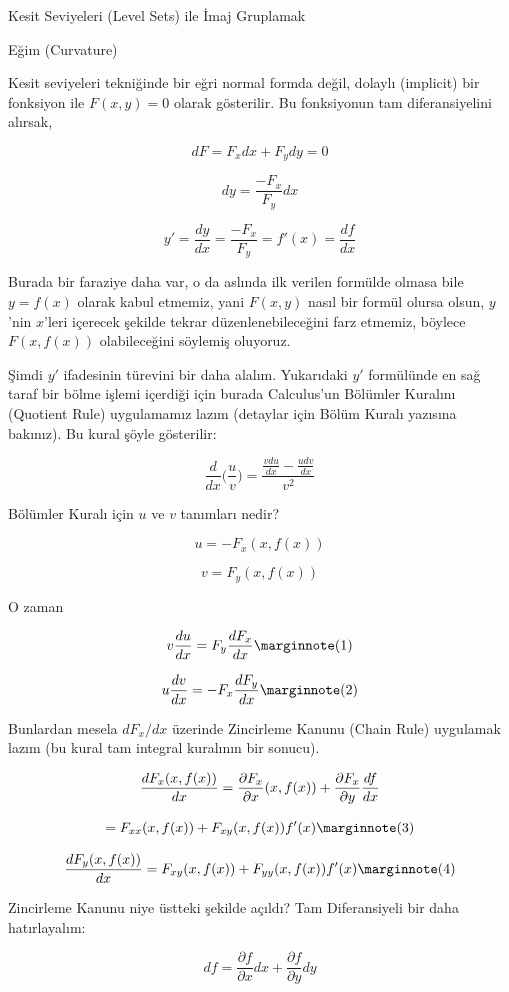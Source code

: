 \documentclass[12pt,fleqn]{article}\usepackage{../../common}
\begin{document}
Kesit Seviyeleri (Level Sets) ile İmaj Gruplamak 

Eğim (Curvature)

Kesit seviyeleri tekniğinde bir eğri normal formda değil, dolaylı
(implicit) bir fonksiyon ile $F(x,y) = 0$ olarak gösterilir. Bu fonksiyonun
tam diferansiyelini alırsak,

$$ dF = F_x dx + F_y dy = 0  $$

$$ dy = \frac{-F_x}{F_y}dx  $$

$$ y' = \frac{dy}{dx} = \frac{-F_x}{F_y} = f'(x) = \frac{df}{dx} $$

Burada bir faraziye daha var, o da aslında ilk verilen formülde olmasa bile
$y=f(x)$ olarak kabul etmemiz, yani $F(x,y)$ nasıl bir formül olursa olsun,
$y$'nin $x$'leri içerecek şekilde tekrar düzenlenebileceğini farz etmemiz,
böylece $F(x,f(x))$ olabileceğini söylemiş oluyoruz.

Şimdi $y'$ ifadesinin türevini bir daha alalım. Yukarıdaki $y'$ formülünde
en sağ taraf bir bölme işlemi içerdiği için burada Calculus'un Bölümler
Kuralını (Quotient Rule) uygulamamız lazım (detaylar için Bölüm Kuralı
yazısına bakınız). Bu kural şöyle gösterilir:

$$ \frac{d}{dx}\bigg(\frac{u}{v}\bigg) = 
\frac{\displaystyle \frac{v du}{dx} - \frac{u dv}{dx}}{v^2} $$

Bölümler Kuralı için $u$ ve $v$ tanımları nedir? 

$$ u = -F_x(x,f(x))  $$

$$ v = F_y(x,f(x)) $$

O zaman

$$ 
v \frac{du}{dx} = F_y \frac{dF_x}{dx} 
\mlabel{1}
$$

$$
u \frac{dv}{dx} = -F_x \frac{dF_y }{dx} 
\mlabel{2}
$$

Bunlardan mesela $dF_x/dx$ üzerinde Zincirleme Kanunu (Chain Rule) uygulamak
lazım (bu kural tam integral kuralının bir sonucu). 

$$ \frac{d F_x(x,f(x)) }{dx} = \frac{\partial F_x}{\partial  x}(x,f(x))+\frac{\partial F_x}{\partial y}\frac{df}{dx}\\ $$

$$
= F_{xx}(x,f(x))+F_{xy}(x,f(x))f'(x) 
\mlabel{3}
$$

$$
\frac{d F_y(x,f(x)) }{dx} =  F_{xy}(x,f(x))+F_{yy}(x,f(x))f'(x) 
\mlabel{4}
$$

Zincirleme Kanunu niye üstteki şekilde açıldı? Tam Diferansiyeli bir daha
hatırlayalım:

$$ df = \frac{\partial f}{\partial x} dx + \frac{\partial f}{\partial y} dy  $$
\end{document}
